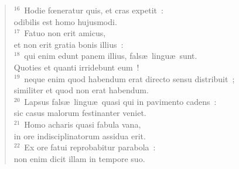 \begin{flushleft}
\begin{verse}
${}^{16}$~Hodie fœneratur quis, et cras expetit~:\\ odibilis est homo hujusmodi.\\
${}^{17}$~Fatuo non erit amicus,\\ et non erit gratia bonis illius~:\\
${}^{18}$~qui enim edunt panem illius, fals\ae\ lingu\ae\ sunt.\\ Quoties et quanti irridebunt eum~!\\
${}^{19}$~neque enim quod habendum erat directo sensu distribuit~;\\ similiter et quod non erat habendum.\\
${}^{20}$~Lapsus fals\ae\ lingu\ae\ quasi qui in pavimento cadens~:\\ sic casus malorum festinanter veniet.\\
${}^{21}$~Homo acharis quasi fabula vana,\\ in ore indisciplinatorum assidua erit.\\
${}^{22}$~Ex ore fatui reprobabitur parabola~:\\ non enim dicit illam in tempore suo.\end{verse}\end{flushleft}


